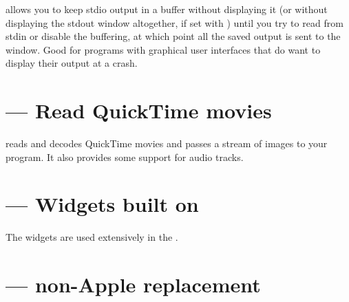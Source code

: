  allows you to keep stdio output in a buffer
without displaying it (or without displaying the stdout window
altogether, if set with ) until you try to read from
stdin or disable the buffering, at which point all the saved output is
sent to the window.  Good for programs with graphical user interfaces
that do want to display their output at a crash.


\section{ --- Read QuickTime movies}

 reads and decodes QuickTime movies and passes
a stream of images to your program. It also provides some support for
audio tracks.

\section{ --- Widgets built on }

The  widgets are used extensively in the .

\section{ --- non-Apple  replacement}

\begin{seealso}
\end{seealso}

